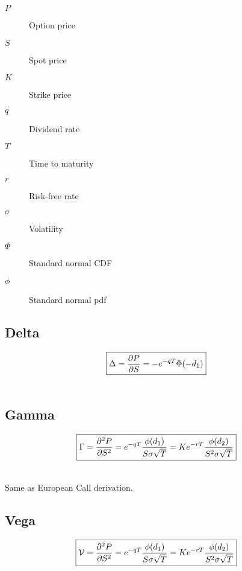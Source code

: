 \documentclass[12pt,a4paper]{article}
\begin{document}
\begin{description}
  \item[$P$] Option price
  \item[$S$] Spot price
  \item[$K$] Strike price
  \item[$q$] Dividend rate
  \item[$T$] Time to maturity
  \item[$r$] Risk-free rate
  \item[$\sigma$] Volatility
  \item[$\Phi$] Standard normal CDF
  \item[$\phi$] Standard normal pdf
\end{description}

\subsection{Delta}

\[
  \boxed{\Delta = \frac{\partial P}{\partial S} = -e^{-qT}\Phi(-d_1)} \\
\]

\[
  \begin{aligned}
  \end{aligned}
\]

\subsection{Gamma}

\[
  \boxed{\Gamma = \frac{\partial^2 P}{\partial S^2} = e^{-qT}\frac{\phi(d_1)}{S\sigma\sqrt{T}} = Ke^{-rT} \frac{\phi(d_2)}{S^2\sigma\sqrt{T}}}\\
\]

\[
  \begin{aligned}
  \end{aligned}
\]

Same as European Call derivation.

\subsection{Vega}

\[
  \boxed{\mathcal{V} = \frac{\partial^2 P}{\partial S^2} = e^{-qT}\frac{\phi(d_1)}{S\sigma\sqrt{T}} = Ke^{-rT} \frac{\phi(d_2)}{S^2\sigma\sqrt{T}}}\\
\]

\[
  \begin{aligned}
  \end{aligned}
\]
\end{document}

